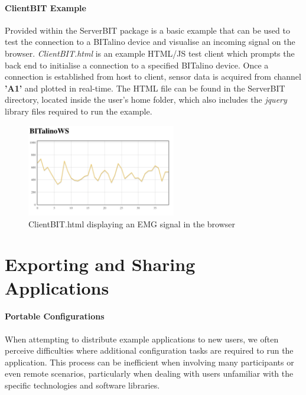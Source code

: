 \paragraph{ClientBIT Example}
Provided within the ServerBIT package is a basic example that can be used to test the connection to a BITalino device and visualise an incoming signal on the browser. \textit{ClientBIT.html} is an example HTML/JS
test client which prompts the back end to initialise a connection to a specified BITalino device. Once a connection is established from host to client, sensor data is acquired from channel \textbf{'A1'} and plotted in real-time. The HTML file can be found in the ServerBIT directory, located inside the user's home folder, which also includes the \textit{jquery} library files required to run the example.

\begin{figure}[htb!]
    \centering
    \includegraphics[width=65mm,scale=0.65]{Chapters/Figures/technical/ServerBIT/ClientBIT_html.png}
    \caption{ClientBIT.html displaying an EMG signal in the browser}
    \label{fig:ClientBIT}
\end{figure}

\section{Exporting and Sharing Applications}

\paragraph{Portable Configurations}

When attempting to distribute example applications to new users, we often perceive difficulties where additional configuration tasks are required to run the application. This process can be inefficient when involving many participants or even remote scenarios, particularly when dealing with users unfamiliar with the specific technologies and software libraries.


